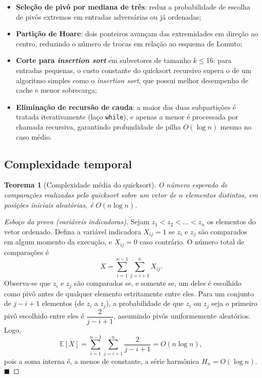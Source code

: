 \documentclass[
	12pt,
	oneside,
	a4paper,
	chapter=TITLE,
	section=TITLE,
	subsection=TITLE,
	subsubsection=TITLE,
	english,
	brazil
]{abntex2}
\theoremstyle{plain}
\newtheorem{teorema}{Teorema}[chapter]
\theoremstyle{remark}
\renewcommand{\_}{\underscoreoriginal\allowbreak}
\begin{document}
\begin{itemize}
	\item \textbf{Seleção de pivô por mediana de três}: reduz a probabilidade de escolha de pivôs extremos em entradas adversárias ou já ordenadas;
	\item \textbf{Partição de Hoare}: dois ponteiros avançam das extremidades em direção ao centro, reduzindo o número de trocas em relação ao esquema de Lomuto;
	\item \textbf{Corte para \emph{insertion sort}} em subvetores de tamanho $k \le 16$: para entradas pequenas, o custo constante do quicksort recursivo supera o de um algoritmo simples como o \emph{insertion sort}, que possui melhor desempenho de cache e menor sobrecarga;
	\item \textbf{Eliminação de recursão de cauda}: a maior das duas subpartições é tratada iterativamente (laço \texttt{while}), e apenas a menor é processada por chamada recursiva, garantindo profundidade de pilha $O(\log n)$ mesmo no caso médio.
\end{itemize}

\subsection{Complexidade temporal}

\begin{teorema}[Complexidade média do quicksort]
\label{teo:quicksort-medio}
O número esperado de comparações realizadas pelo quicksort sobre um vetor de $n$ elementos distintos, em posições iniciais aleatórias, é $O(n \log n)$.
\end{teorema}

\begin{proof}[Esboço da prova (variáveis indicadoras)]
Sejam $z_1 < z_2 < \dots < z_n$ os elementos do vetor ordenado. Defina a variável indicadora $X_{ij} = 1$ se $z_i$ e $z_j$ são comparados em algum momento da execução, e $X_{ij}=0$ caso contrário. O número total de comparações é
\[
X = \sum_{i=1}^{n-1}\sum_{j=i+1}^{n} X_{ij}.
\]
Observa-se que $z_i$ e $z_j$ são comparados se, e somente se, um deles é escolhido como pivô antes de qualquer elemento estritamente entre eles. Para um conjunto de $j - i + 1$ elementos (de $z_i$ a $z_j$), a probabilidade de que $z_i$ ou $z_j$ seja o primeiro pivô escolhido entre eles é $\dfrac{2}{j-i+1}$, assumindo pivôs uniformemente aleatórios. Logo,
\[
\mathbb{E}[X] = \sum_{i=1}^{n-1}\sum_{j=i+1}^{n} \frac{2}{j-i+1} = O(n \log n),
\]
pois a soma interna é, a menos de constante, a série harmônica $H_n = O(\log n)$. $\blacksquare$
\end{proof}
\end{document}
